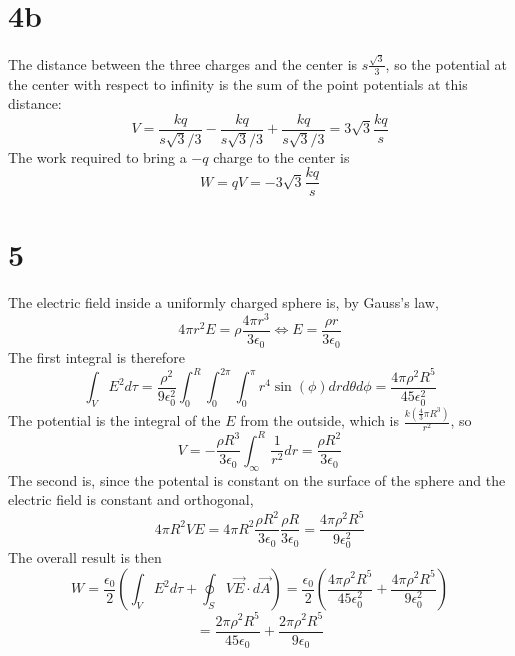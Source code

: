 \documentclass{article}
\begin{document}
\section*{4b}
The distance between the three charges and the center is $s\frac{\sqrt{3}}{3}$, so the potential at the center with respect to infinity is the sum of the point potentials at this distance:
\[V=\frac{kq}{s\sqrt{3}/{3}}-\frac{kq}{s\sqrt{3}/3}+\frac{kq}{s\sqrt{3}/3}=3\sqrt{3}\frac{kq}{s}\]
The work required to bring a $-q$ charge to the center is \[W=qV=-3\sqrt{3}\frac{kq}{s}\]
\section*{5}
The electric field inside a uniformly charged sphere is, by Gauss's law, \[4\pi r^2E=\rho\frac{4\pi r^3}{3\epsilon_0}\Leftrightarrow E=\frac{\rho r}{3\epsilon_0}\]
The first integral is therefore \[\int_VE^2d\tau=\frac{\rho^2}{9\epsilon_0^2}\int_0^R\int_0^{2\pi}\int_0^\pi r^4\sin(\phi)drd\theta d\phi=\frac{4\pi\rho^2R^5}{45\epsilon_0^2}\]
The potential is the integral of the $E$ from the outside, which is $\frac{k(\frac{4}{3}\pi R^3)}{r^2}$, so \[V=-\frac{ \rho R^3}{3\epsilon_0}\int_\infty^R\frac{1}{r^2}dr=\frac{\rho R^2}{3\epsilon_0}\]
The second is, since the potental is constant on the surface of the sphere and the electric field is constant and orthogonal, \[4\pi R^2VE=4\pi R^2 \frac{\rho R^2}{3\epsilon_0}\frac{\rho  R}{3\epsilon_0}=\frac{4\pi\rho^2 R^5}{9\epsilon_0^2 }\]
The overall result is then \[W=\frac{\epsilon_0}{2}\left(\int_VE^2d\tau+\oint_SV\vec{E}\cdot d\vec{A}\right)=\frac{\epsilon_0}{2}\left(\frac{4\pi\rho^2R^5}{45\epsilon_0^2}+\frac{4\pi\rho^2 R^5}{9\epsilon_0^2 }\right)\]
\[=\frac{2\pi\rho^2R^5}{45\epsilon_0}+\frac{2\pi\rho^2R^5}{9\epsilon_0}\]
\end{document}
